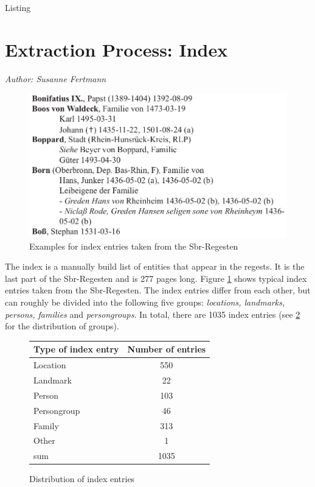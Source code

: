 Listing\section{Extraction Process: Index}
\label{sec:index}

\emph{Author: Susanne Fertmann} \\

\begin{figure}[h]
  \centering
  \includegraphics[scale=0.3]{img/index-examples}
  \caption{Examples for index entries taken from the Sbr-Regesten}
  \label{fig:index-examples}
\end{figure}
The index is a manually build list of entities that appear in the regests. It is the last part of the Sbr-Regesten and is 277 pages long. Figure \ref{fig:index-examples} shows typical index entries taken from the Sbr-Regesten. The index entries differ from each other, but can roughly be divided into the following five groups: \textit{locations, landmarks, persons, families} and \textit{persongroups}. In total, there are 1035 index entries (see \ref{fig:type-table} for the distribution of groups). 

\begin{figure}[h]
\centering
\begin{tabular}{|l|c|}
\hline
Type of index entry & Number of entries  \\
\hline
Location            & 550 \\
Landmark            & 22  \\
Person              & 103 \\
Persongroup         & 46  \\
Family              & 313 \\
Other               & 1   \\
\hline
sum         & 1035\\
\hline
\end{tabular} 
\caption{Distribution of index entries}
\label{fig:type-table}
\end{figure}

